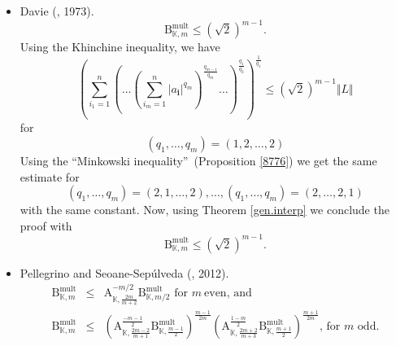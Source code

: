 \documentclass[10pt]{amsart}
\numberwithin{equation}{section}
\begin{document}
\begin{itemize}
\item Davie (\cite{davie}, 1973).
\begin{equation*}
\mathrm{B}_{\mathbb{K},m}^{\mathrm{mult}} \leq \left( \sqrt{2}\right) ^{m-1}.
\end{equation*}
Using the Khinchine inequality, we have
\begin{equation*}
\left( \sum_{i_{1}=1}^{n}\left( \dots \left( \sum_{i_{m}=1}^{n}|a_{\mathbf{i}}|^{q_{m}}\right) ^{\frac{q_{m-1}}{q_{m}}}\dots \right) ^{\frac{q_{1}}{q_{2}}}\right) ^{\frac{1}{q_{1}}}\leq \left( \sqrt{2}\right) ^{m-1}\Vert L\Vert
\end{equation*}for
\begin{equation*}
\left( q_{1},\ldots ,q_{m}\right) =\left( 1,2,\ldots ,2\right)
\end{equation*}Using the \textquotedblleft Minkowski inequality\textquotedblright\
(Proposition \ref{8776}) we get the same estimate for\begin{equation*}
\left( q_{1},\ldots ,q_{m}\right) =\left( 2,1,\ldots ,2\right) ,\ldots
,\left( q_{1},\ldots ,q_{m}\right) =\left( 2,\ldots ,2,1\right)
\end{equation*}with the same constant. Now, using Theorem \ref{gen.interp} we conclude the
proof with
\begin{equation*}
\mathrm{B}_{\mathbb{K},m}^{\mathrm{mult}}\leq \left( \sqrt{2}\right) ^{m-1}.
\end{equation*}

\item Pellegrino and Seoane-Sep\'ulveda (\cite{pseo}, 2012).
\begin{eqnarray*}
\mathrm{B}_{\mathbb{K},m}^{\mathrm{mult}} &\leq &\mathrm{A}_{\mathbb{K},\frac{2m}{m+2}}^{-m/2}\mathrm{B}_{\mathbb{K},m/2}^{\mathrm{mult}}\text{ for }m~\text{even, and} \\
\mathrm{B}_{\mathbb{K},m}^{\mathrm{mult}} &\leq &\left( \mathrm{A}_{\mathbb{K},\frac{2m-2}{m+1}}^{\frac{-m-1}{2}}\mathrm{B}_{\mathbb{K},\frac{m-1}{2}}^{\mathrm{mult}}\right) ^{\frac{m-1}{2m}}\left( \mathrm{A}_{\mathbb{K},\frac{2m+2}{m+3}}^{\frac{1-m}{2}}\mathrm{B}_{\mathbb{K},\frac{m+1}{2}}^{\mathrm{mult}}\right) ^{\frac{m+1}{2m}}\text{, for }m\text{ odd.}
\end{eqnarray*}
\end{itemize}
\end{document}
